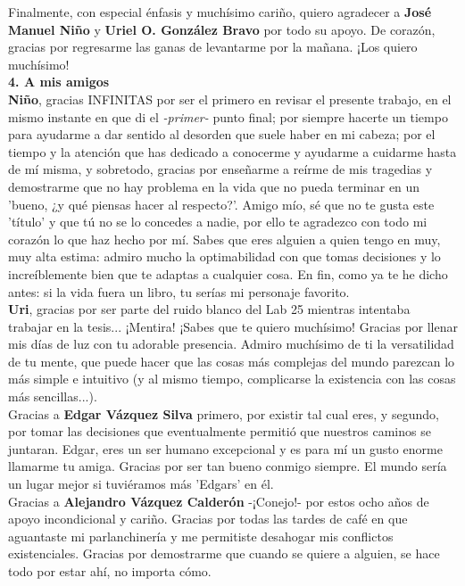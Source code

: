 \documentclass[
12pt, %
spanish, %
onehalfspacing, %
headsepline, %
]{MastersDoctoralThesis} %
\begin{document}
\begin{acknowledgements}
Finalmente, con especial énfasis y muchísimo cariño, quiero agradecer a \textbf{José Manuel Niño} y \textbf{Uriel O. González Bravo} por todo su apoyo. De corazón, gracias por regresarme las ganas de levantarme por la mañana. ¡Los quiero muchísimo!\\

\textbf{4. A mis amigos}\\

\textbf{Niño}, gracias INFINITAS por ser el primero en revisar el presente trabajo, en el mismo instante en que di el \textit{-primer-} punto final; por siempre hacerte un tiempo para ayudarme a dar sentido al desorden que suele haber en mi cabeza; por el tiempo y la atención que has dedicado a conocerme y ayudarme a cuidarme hasta de mí misma, y sobretodo,  gracias por enseñarme a reírme de mis tragedias y demostrarme que no hay problema en la vida que no pueda terminar en un 'bueno, ¿y qué piensas hacer al respecto?'. Amigo mío, sé que no te gusta este 'título' y que tú no se lo concedes a nadie, por ello te agradezco con todo mi corazón lo que haz hecho por mí. Sabes que eres alguien a quien tengo en muy, muy alta estima: admiro mucho la optimabilidad con que tomas decisiones y lo increíblemente bien que te adaptas a cualquier cosa. En fin, como ya te he dicho antes: si la vida fuera un libro, tu serías mi personaje favorito.\\

\textbf{Uri}, gracias por ser parte del ruido blanco del Lab 25 mientras intentaba trabajar en la tesis... ¡Mentira! ¡Sabes que te quiero muchísimo! Gracias por llenar mis días de luz con tu adorable presencia. Admiro muchísimo de ti la versatilidad de tu mente, que puede hacer que las cosas más complejas del mundo parezcan lo más simple e intuitivo (y al mismo tiempo, complicarse la existencia con las cosas más sencillas...).\\

Gracias a \textbf{Edgar Vázquez Silva} primero, por existir tal cual eres, y segundo, por tomar las decisiones que eventualmente permitió que nuestros caminos se juntaran. Edgar, eres un ser humano excepcional y es para mí un gusto enorme llamarme tu amiga. Gracias por ser tan bueno conmigo siempre. El mundo sería un lugar mejor si tuviéramos más 'Edgars' en él.\\

Gracias a \textbf{Alejandro Vázquez Calderón} -¡Conejo!- por estos ocho años de apoyo incondicional y cariño. Gracias por todas las tardes de café en que aguantaste mi parlanchinería y me permitiste desahogar mis conflictos existenciales. Gracias por demostrarme que cuando se quiere a alguien, se hace todo por estar ahí, no importa cómo.\\


\end{acknowledgements}
\end{document}
